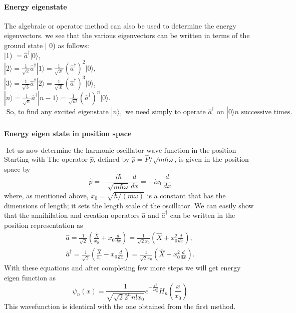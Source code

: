 \paragraph{Energy eigenstate}
The algebraic or operator method can also be used to determine the energy eigenvectors.  we see that the various eigenvectors can be written in terms of the ground state | 0) as follows:\\
|1) $=\hat{a}^{\dagger}|0\rangle$,\\
$|2\rangle=\frac{1}{\sqrt{2}} \hat{a}^{\dagger}|1\rangle=\frac{1}{\sqrt{2 !}}\left(\hat{a}^{\dagger}\right)^{2}|0\rangle$,\\
$|3\rangle=\frac{1}{\sqrt{3}} \hat{a}^{\dagger}|2\rangle=\frac{1}{\sqrt{3 !}}\left(\hat{a}^{\dagger}\right)^{3}|0\rangle$,\\
$|n\rangle=\frac{1}{\sqrt{n}} \hat{a}^{\dagger}|n-1\rangle=\frac{1}{\sqrt{n !}}\left(\hat{a}^{\dagger}\right)^{n}|0\rangle .$\\
$\text { So, to find any excited eigenstate }|n\rangle, \text { we need simply to operate } \hat{a}^{\dagger} \text { on }|0\rangle n \text { successive times. }$
 \paragraph{Energy eigen state in position space}
 $\text { Iet us now determine the harmonic oscillator wave function in the position representation. }$ \\
 Starting with The operator $\hat{p}$, defined by $\hat{p}=\hat{P} / \sqrt{m \hbar \omega}$, is given in the position space by
 $$
 \hat{p}=-\frac{i \hbar}{\sqrt{m \hbar \omega}} \frac{d}{d x}=-i x_{0} \frac{d}{d x}
 $$
 where, as mentioned above, $x_{0}=\sqrt{\hbar /(m \omega)}$ is a constant that has the dimensions of length; it sets the length scale of the oscillator. We can easily show that the annihilation and creation operators $\hat{a}$ and $\hat{a}^{\dagger}$ can be written in the position representation as
 $$\begin{gathered}
 \hat{a}=\frac{1}{\sqrt{2}}\left(\frac{\hat{X}}{x_{0}}+x_{0} \frac{d}{d x}\right)=\frac{1}{\sqrt{2} x_{0}}\left(\hat{X}+x_{0}^{2} \frac{d}{d x}\right), \\
 \hat{a}^{\dagger}=\frac{1}{\sqrt{2}}\left(\frac{\hat{X}}{x_{0}}-x_{0} \frac{d}{d x}\right)=\frac{1}{\sqrt{2} x_{0}}\left(\hat{X}-x_{0}^{2} \frac{d}{d x}\right) .
 \end{gathered}$$
 With these equations and after completing few more steps we will get energy eigen function as \\
 $$\psi_{n}(x)=\frac{1}{\sqrt{\sqrt{2}2^{n}n!x_{0}}}e^{-\frac{x^2}{2x_0^2}}H_n\left( \frac{x}{x_0}\right) $$
 This wavefunction is identical with the one obtained from the first method.\\
